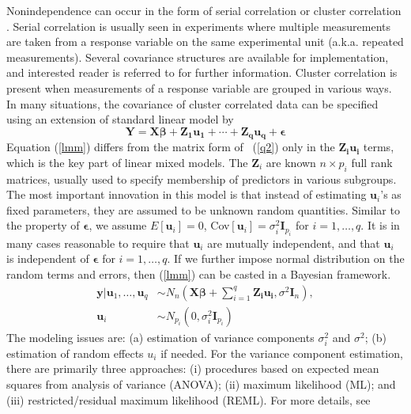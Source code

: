	Nonindependence can occur in the form of serial correlation or cluster correlation \citep[chapter~17]{rencher2008linear}. Serial correlation is usually seen in experiments where multiple measurements  are taken from a response variable on the same experimental unit (a.k.a. repeated measurements). Several covariance structures are available for implementation, and interested reader is referred to \cite[chapter~5]{littell2006sas} for further information.  Cluster correlation is present when measurements of a response variable are grouped in various ways. In many situations, the covariance of cluster correlated data can be specified using an extension of standard linear model by 
	\begin{equation}\label{lmm}
	\bm Y = \bm {X\beta} + \bm {Z_1u_1}+\cdots + \bm {Z_qu_q} + \bm \epsilon	
	\end{equation}
	Equation (\ref{lmm}) differs from the matrix form of ~(\ref{q2}) only in the $\bm {Z_iu_i}$ terms, which is the key part of linear mixed models.  The $\bm Z_i$  are known $n\times p_i$ full rank matrices, usually used to specify membership of predictors in various subgroups. The most important innovation in this model is that instead of estimating $\bm u_i$'s as fixed parameters, they are assumed to be unknown random quantities. Similar to the property of  $\bm \epsilon$, we assume $E[\bm u_i]=0$, Cov$[\bm u_i]= \sigma_i^2 \bm I_{p_i}$ for $i=1, \ldots, q$. It is in many cases reasonable to  require that $\bm u_i$ are mutually independent, and that $\bm u_i$ is independent of $\bm \epsilon$ for $i=1, \ldots, q$. If we further impose normal distribution on the random terms and errors, then (\ref{lmm}) can be casted in a Bayesian framework.
	\begin{equation}\label{lmmGuass}
	\begin{split}
	\bm y|\bm u_1, \ldots, \bm u_q   & \sim  N_n(\bm {X\beta} + \sum_{i=1}^q \bm {Z_iu_i}, \sigma^2\bm I_n),  \\
	\bm u_i &\sim N_{p_i}(0, \sigma_i^2 \bm I_{p_i})
	\end{split}
	\end{equation}
	The modeling issues are: (a) estimation of variance components $\sigma_i^2$ and $\sigma^2$; (b) estimation of random effects $u_i$ if needed. For the variance component estimation, there are primarily three approaches: (i) procedures based on expected mean squares from analysis of variance (ANOVA); (ii) maximum likelihood (ML); and (iii) restricted/residual maximum likelihood (REML). For more details, see \cite[Chapter 1]{littell2006sas}
	
